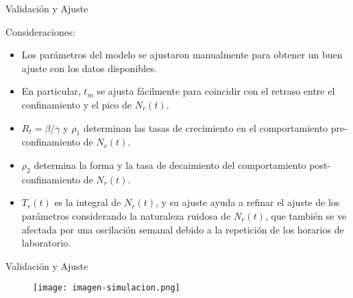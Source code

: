 \documentclass{beamer}
\begin{document}
\begin{frame}{Validación y Ajuste}
\begin{justify}

{\footnotesize
Consideraciones:
\begin{itemize}
\justifying
    \item Los parámetros del modelo se ajustaron manualmente para obtener un buen ajuste con los datos disponibles.
    \vspace{0.3cm}
    \item En particular, \( t_m \) se ajusta fácilmente para coincidir con el retraso entre el confinamiento y el pico de \( N_r(t) \).
    \vspace{0.3cm}
    \item \( R_t = \beta/\gamma \) y \( \rho_1 \) determinan las tasas de crecimiento en el comportamiento pre-confinamiento de \( N_r(t) \).
    \vspace{0.3cm}
    \item \( \rho_2 \) %
    determina la forma y la tasa de decaimiento del comportamiento post-confinamiento de \( N_r(t) \).
    \vspace{0.3cm}
    \item \( T_r(t) \) es la integral de \( N_r(t) \), y su ajuste ayuda a refinar el ajuste de los parámetros considerando la naturaleza ruidosa de \( N_r(t) \), que también se ve afectada por una oscilación semanal debido a la repetición de los horarios de laboratorio.
    \vspace{0.3cm}
    
\end{itemize}
}

\end{justify}
\end{frame}

\begin{frame}{Validación y Ajuste}
\begin{justify}
\small
{\footnotesize

\begin{figure}[H]
\centering
\texttt{[image: imagen-simulacion.png]}
\captionsetup{justification=centering}
\label{C2}
\end{figure}
}


\end{justify}
\end{frame}
\end{document}
